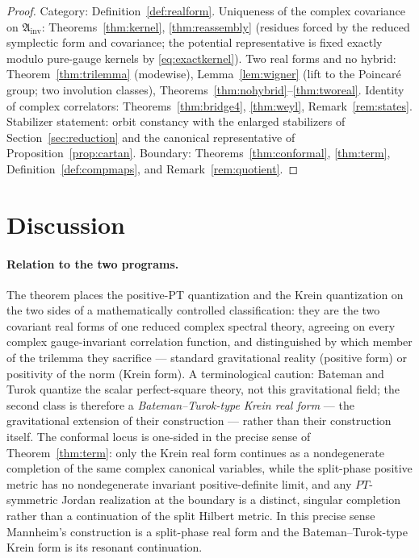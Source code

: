 \documentclass[11pt]{article}
\theoremstyle{definition}
\theoremstyle{remark}
\begin{document}
\begin{proof}
Category: Definition~\ref{def:realform}.  Uniqueness of the complex
covariance on $\mathfrak A_{\mathrm{inv}}$: Theorems~\ref{thm:kernel},
\ref{thm:reassembly} (residues forced by the reduced symplectic form and
covariance; the potential representative is fixed exactly modulo
pure-gauge kernels by \eqref{eq:exactkernel}).  Two real forms and no
hybrid: Theorem~\ref{thm:trilemma} (modewise), Lemma~\ref{lem:wigner}
(lift to the Poincar\'e group; two involution classes),
Theorems~\ref{thm:nohybrid}--\ref{thm:tworeal}.  Identity of complex
correlators: Theorems~\ref{thm:bridge4}, \ref{thm:weyl},
Remark~\ref{rem:states}.  Stabilizer statement: orbit constancy
\cite{companion3} with the enlarged stabilizers of
Section~\ref{sec:reduction} and the canonical representative of
Proposition~\ref{prop:cartan}.  Boundary: Theorems~\ref{thm:conformal},
\ref{thm:term}, Definition~\ref{def:compmaps}, and
Remark~\ref{rem:quotient}.
\end{proof}

\section{Discussion}\label{sec:discussion}

\paragraph{Relation to the two programs.}
The theorem places the positive-PT quantization \cite{BM2008PRD,
Mannheim2021} and the Krein quantization on the two sides of
a mathematically controlled classification: they are the two covariant
real forms of one reduced complex spectral theory, agreeing on every
complex gauge-invariant correlation function, and distinguished by which
member of the trilemma they sacrifice --- standard gravitational reality
(positive form) or positivity of the norm (Krein form).  A terminological
caution: Bateman and Turok \cite{BT2026} quantize the scalar
perfect-square theory, not this gravitational field; the second class is
therefore a \emph{Bateman--Turok-type Krein real form} --- the
gravitational extension of their construction --- rather than their
construction itself.  The conformal locus is one-sided in the precise
sense of Theorem~\ref{thm:term}: only the Krein real form continues as a
nondegenerate completion of the same complex canonical variables, while
the split-phase positive metric has no nondegenerate invariant
positive-definite limit, and any $PT$-symmetric Jordan realization at the
boundary \cite{BM2008Jordan} is a distinct, singular completion rather
than a continuation of the split Hilbert metric.  In this precise sense
Mannheim's construction is a split-phase real form and the
Bateman--Turok-type Krein form is its resonant continuation.
\end{document}

